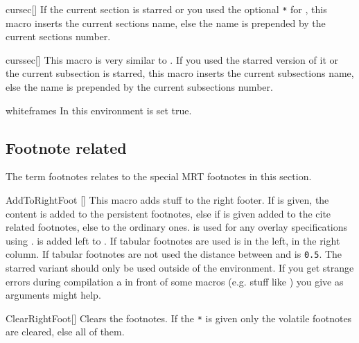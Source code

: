 \begin{describemacro}{cursec}[\meta{*}]
  If the current section is starred or you used the optional \texttt{*} for
  , this macro inserts the current sections name, else the name is
  prepended by the current sections number.
\end{describemacro}

\begin{describemacro}{curssec}[\meta{*}]
  This macro is very similar to . If you used the starred version of
  it or the current subsection is starred, this macro inserts the current
  subsections name, else the name is prepended by the current subsections
  number.
\end{describemacro}

\begin{describeenv}{whiteframes}
  In this environment  is set true.
\end{describeenv}

\subsection{Footnote related}\label{sec:beam:macros:foot}
The term footnotes relates to the special MRT footnotes in this section.
\begin{describemacro}{AddToRightFoot}%
  [\meta{*}\meta{+}]
  This macro adds stuff to the right footer. If \meta{*} is given, the content
  is added to the persistent footnotes, else if \meta{+} is given added to the
  cite related footnotes, else to the ordinary ones.  is used for
  any overlay specifications using .  is added left to
  . If tabular footnotes are used  is in the left,
   in the right column. If tabular footnotes are not used the
  distance between  and  is \texttt{0.5}. The
  starred variant should only be used outside of the  environment. If
  you get strange errors during compilation a  in front of some
  macros (e.g. stuff like ) you give as arguments might help.
\end{describemacro}

\begin{describemacro}{ClearRightFoot}[\meta{*}]
  Clears the footnotes. If the \texttt{*} is given only the volatile footnotes
  are cleared, else all of them.
\end{describemacro}


